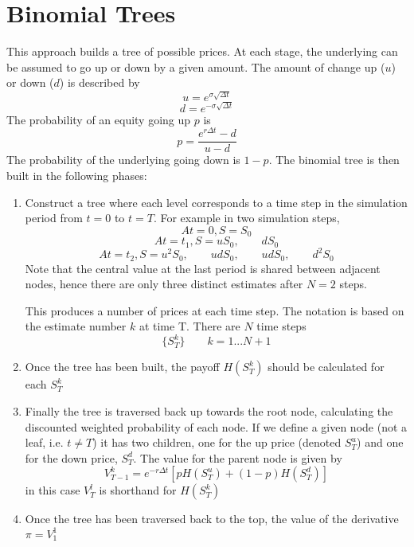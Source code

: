 \section{Binomial Trees \cite{advancedquantcpp}}

This approach builds a tree of possible prices. At each stage, the underlying can be assumed to go up or down by a given amount. The amount of change up ($u$) or down ($d$) is described by
\begin{equation}
	u=e^{\sigma\sqrt{\Delta{}t}}
\end{equation}
\begin{equation}
	d=e^{-\sigma\sqrt{\Delta{}t}}
\end{equation}
The probability of an equity going up $p$ is
\begin{equation}
p=\frac{e^{r\Delta{}t}-d}{u-d}
\end{equation}
The probability of the underlying going down is $1-p$. The binomial tree is then built in the following phases:

\begin{enumerate}
	\item Construct a tree where each level corresponds to a time step in the simulation period from $t=0$ to $t=T$. For example in two simulation steps, 
	\begin{equation}
		At = 0, S = S_0
	\end{equation}
	\begin{equation}
		At = t_1, S = uS_0,\qquad dS_0
	\end{equation}
	\begin{equation}
		At = t_2, S = u^2S_0,\qquad udS_0,\qquad udS_0,\qquad d^2S_0
	\end{equation}
	Note that the central value at the last period is shared between adjacent nodes, hence there are only three distinct estimates after $N=2$ steps.
	
	This produces a number of prices at each time step. The notation is based on the estimate number $k$ at time T. There are $N$ time steps
	\begin{equation}
		\{S_T^k\}\qquad k=1...N+1
	\end{equation}
	
	\item Once the tree has been built, the payoff $H(S_T^k)$ should be calculated for each $S_T^k$
	
	\item Finally the tree is traversed back up towards the root node, calculating the discounted weighted probability of each node. If we define a given node (not a leaf, i.e. $t\neq T$) it has two children, one for the up price (denoted $S_T^u$) and one for the down price, $S_T^d$. The value for the parent node is given by 
	\begin{equation}
	V_{T-1}^k = e^{-r\Delta{}t}[pH(S_T^u) + (1-p)H(S_T^d)]
	\end{equation}
	in this case $V_T^l$ is shorthand for $H(S_T^k)$
	
	\item Once the tree has been traversed back to the top, the value of the derivative $\pi=V_1^1$
\end{enumerate}


